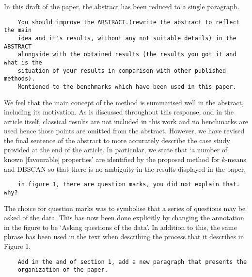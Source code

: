 \documentclass[11pt]{article}
\begin{document}
In this draft of the paper, the abstract has been reduced to a single
paragraph.\\

\begin{tcolorbox}
\begin{verbatim}
    You should improve the ABSTRACT.(rewrite the abstract to reflect the main
    idea and it's results, without any not suitable details) in the ABSTRACT
    alongside with the obtained results (the results you got it and what is the
    situation of your results in comparison with other published methods).
    Mentioned to the benchmarks which have been used in this paper.
\end{verbatim}
\end{tcolorbox}

We feel that the main concept of the method is summarised well in the abstract,
including its motivation. As is discussed throughout this response, and in the
article itself, classical results are not included in this work and no
benchmarks are used hence those points are omitted from the abstract. However,
we have revised the final sentence of the abstract to more accurately describe
the case study provided at the end of the article. In particular, we state that
`a number of known [favourable] properties' are identified by the proposed
method for \(k\)-means and DBSCAN so that there is no ambiguity in the results
displayed in the paper.\\

\begin{tcolorbox}
\begin{verbatim}
    in figure 1, there are question marks, you did not explain that. why?
\end{verbatim}
\end{tcolorbox}

The choice for question marks was to symbolise that a series of questions may be
asked of the data. This has now been done explicitly by changing the annotation
in the figure to be `Asking questions of the data'. In addition to this, the
same phrase has been used in the text when describing the process that it
describes in Figure 1.\\

\begin{tcolorbox}
\begin{verbatim}
    Add in the and of section 1, add a new paragraph that presents the
    organization of the paper.
\end{verbatim}
\end{tcolorbox}
\end{document}
